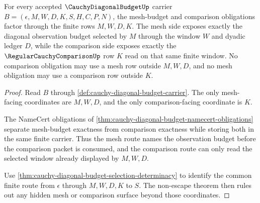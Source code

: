 \begin{theorem}
\label{thm:cauchy-diagonal-budget-mesh-comparison-exactness}
For every accepted $\CauchyDiagonalBudgetUp$ carrier $B=(\epsilon,M,W,D,K,S,H,C,P,N)$, the mesh-budget and comparison obligations factor through the finite rows $M,W,D,K$. The mesh side exposes exactly the diagonal observation budget selected by $M$ through the window $W$ and dyadic ledger $D$, while the comparison side exposes exactly the $\RegularCauchyComparisonUp$ row $K$ read on that same finite window. No comparison obligation may use a mesh row outside $M,W,D$, and no mesh obligation may use a comparison row outside $K$.
\end{theorem}
\begin{proof}
Read $B$ through \autoref{def:cauchy-diagonal-budget-carrier}. The only mesh-facing coordinates are $M,W,D$, and the only comparison-facing coordinate is $K$.

The NameCert obligations of \autoref{thm:cauchy-diagonal-budget-namecert-obligations} separate mesh-budget exactness from comparison exactness while storing both in the same finite carrier. Thus the mesh route names the observation budget before the comparison packet is consumed, and the comparison route can only read the selected window already displayed by $M,W,D$.

Use \autoref{thm:cauchy-diagonal-budget-selection-determinacy} to identify the common finite route from $\epsilon$ through $M,W,D,K$ to $S$. The non-escape theorem then rules out any hidden mesh or comparison surface beyond those coordinates.
\end{proof}


